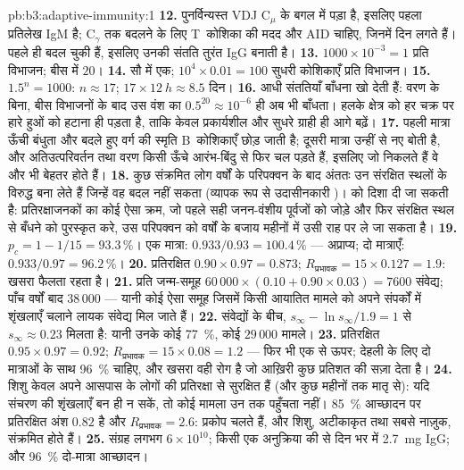 \begin{solution}{pb:b3:adaptive-immunity:1}
\textbf{12.} पुनर्विन्यस्त VDJ C$_{\mu}$ के बगल में पड़ा है, इसलिए पहला
प्रतिलेख IgM है; C$_{\gamma}$ तक बदलने के लिए T~कोशिका की मदद और AID
चाहिए, जिनमें दिन लगते हैं।  पहले ही बदल चुकी हैं,
इसलिए उनकी संतति तुरंत IgG बनाती है।
\textbf{13.} $1000\times 10^{-3} = 1$ प्रति विभाजन; बीस में $20$।
\textbf{14.} सौ में एक; $10^{4}\times 0.01 = 100$ सुधरी कोशिकाएँ प्रति
विभाजन।
\textbf{15.} $1.5^{n} = 1000$: $n \approx 17$; $17\times \qty{12}{h}
\approx 8.5$ दिन।
\textbf{16.} आधी संततियाँ बाँधना खो देती हैं: वरण के बिना, बीस विभाजनों
के बाद उस वंश का $0.5^{20}
\approx 10^{-6}$ ही अब भी बाँधता। हलके क्षेत्र को हर चक्र पर हारे हुओं
को हटाना ही पड़ता है, ताकि केवल प्रकार्यशील और सुधरे ग्राही ही आगे बढ़ें।
\textbf{17.} पहली मात्रा ऊँची बंधुता और बदले हुए वर्ग की स्मृति
B~कोशिकाएँ छोड़ जाती है; दूसरी मात्रा उन्हीं से नए  बोती है,
और अतिउत्परिवर्तन तथा वरण किसी ऊँचे आरंभ-बिंदु से फिर चल पड़ते हैं,
इसलिए जो  निकलते हैं वे और भी बेहतर होते हैं।
\textbf{18.} कुछ संक्रमित लोग वर्षों के परिपक्वन के बाद अंततः उन
संरक्षित स्थलों के विरुद्ध  बना लेते हैं जिन्हें वह 
बदल नहीं सकता (व्यापक रूप से उदासीनकारी )।  को
दिशा दी जा सकती है: प्रतिरक्षाजनकों का कोई ऐसा क्रम, जो पहले सही
जनन-वंशीय पूर्वजों को जोड़े और फिर संरक्षित स्थल से बँधने को पुरस्कृत
करे, उस परिपक्वन को वर्षों के बजाय महीनों में उसी राह पर ले जा सकता है।
\textbf{19.} $p_{c} = 1 - 1/15 = 93.3\,\%$। एक मात्रा: $0.933/0.93 =
100.4\,\%$ --- अप्राप्य; दो मात्राएँ: $0.933/0.97 = 96.2\,\%$।
\textbf{20.} प्रतिरक्षित $0.90\times 0.97 = 0.873$; $R_{\text{प्रभावक}} = 15\times
0.127 = 1.9$: खसरा फैलता रहता है।
\textbf{21.} प्रति जन्म-समूह $60\,000\times (0.10 + 0.90\times 0.03) = 7600$
संवेद्य; पाँच वर्षों बाद $38\,000$ --- यानी कोई ऐसा समूह जिसमें किसी
आयातित मामले को अपने संपर्कों में शृंखलाएँ चलाने लायक संवेद्य मिल जाते
हैं।
\textbf{22.} संवेद्यों के बीच, $s_{\infty} - \ln s_{\infty}/1.9 =
1$ से $s_{\infty} \approx 0.23$ मिलता है: यानी उनके कोई \qty{77}{\%},
कोई $29\,000$ मामले।
\textbf{23.} प्रतिरक्षित $0.95\times 0.97 = 0.92$; $R_{\text{प्रभावक}} = 15\times
0.08 = 1.2$ --- फिर भी एक से ऊपर; देहली के लिए दो मात्राओं के साथ
\qty{96}{\%} चाहिए, और खसरा वही रोग है जो आख़िरी कुछ प्रतिशत की सज़ा
देता है।
\textbf{24.} शिशु केवल अपने आसपास के लोगों की प्रतिरक्षा से सुरक्षित
हैं (और कुछ महीनों तक मातृ  से): यदि संचरण की शृंखलाएँ बन ही
न सकें, तो कोई मामला उन तक पहुँचता नहीं। \qty{85}{\%} आच्छादन पर
प्रतिरक्षित अंश $0.82$ है और $R_{\text{प्रभावक}} = 2.6$: प्रकोप चलते हैं,
और शिशु, अटीकाकृत तथा सबसे नाज़ुक, संक्रमित होते हैं।
\textbf{25.} संग्रह लगभग $6\times 10^{10}$; किसी एक अनुक्रिया की
 से दिन भर में \qty{2.7}{mg} IgG; और \qty{96}{\%}
दो-मात्रा आच्छादन।
\end{solution}
